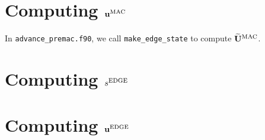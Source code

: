 \documentclass[11pt]{article}
\def\edge  {\rm EDGE}
\def\mac   {\rm MAC}
\def\ub    {{\bf u}}
\def\Ubt   {\widetilde{\bf U}}
\begin{document}
\section{Computing $\ub^{\mac}$}
In {\tt advance\_premac.f90}, we call {\tt make\_edge\_state} to compute $\Ubt^{\mac}$.
\section{Computing $s^{\edge}$}
\section{Computing $\ub^{\edge}$}
\end{document}
